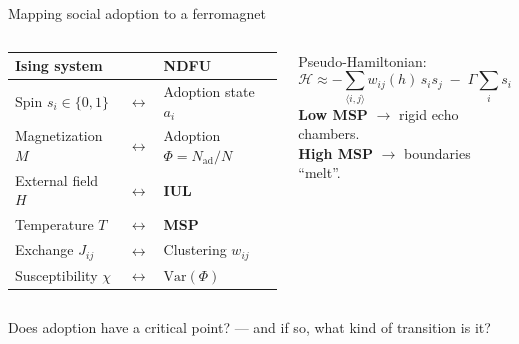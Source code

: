 \documentclass[aspectratio=169,11pt]{beamer}
\newcommand{\emphr}[1]{{\color{ndreddark}\textbf{#1}}}
\begin{document}
\begin{frame}{Mapping social adoption to a ferromagnet}
\begin{columns}[c]
\renewcommand{\arraystretch}{1.35}
\begin{tabular}{@{}l@{\;\;}c@{\;\;}l@{}}
\toprule
\textbf{Ising system} & & \textbf{NDFU} \\
\midrule
Spin $s_i\in\{0,1\}$        & $\leftrightarrow$ & Adoption state $a_i$ \\
Magnetization $M$           & $\leftrightarrow$ & Adoption $\Phi=N_{\text{ad}}/N$ \\
External field $H$          & $\leftrightarrow$ & \emphr{IUL} \\
Temperature $T$             & $\leftrightarrow$ & \emphr{MSP} \\
Exchange $J_{ij}$           & $\leftrightarrow$ & Clustering $w_{ij}$ \\
Susceptibility $\chi$       & $\leftrightarrow$ & $\mathrm{Var}(\Phi)$ \\
\bottomrule
\end{tabular}
\small
Pseudo-Hamiltonian:
\begin{equation*}
\mathcal{H}\approx -\!\!\sum_{\langle i,j\rangle}\! w_{ij}(h)\,s_i s_j \;-\; \Gamma\sum_i s_i
\end{equation*}
\vspace{0.1cm}
\emphr{Low MSP} $\to$ rigid echo chambers.\\[3pt]
\emphr{High MSP} $\to$ boundaries ``melt''.
\end{columns}
\vspace{0.3cm}
\begin{center}\small
Does adoption have a critical point? — and if so, what kind of transition is it?
\end{center}
\end{frame}
\end{document}
